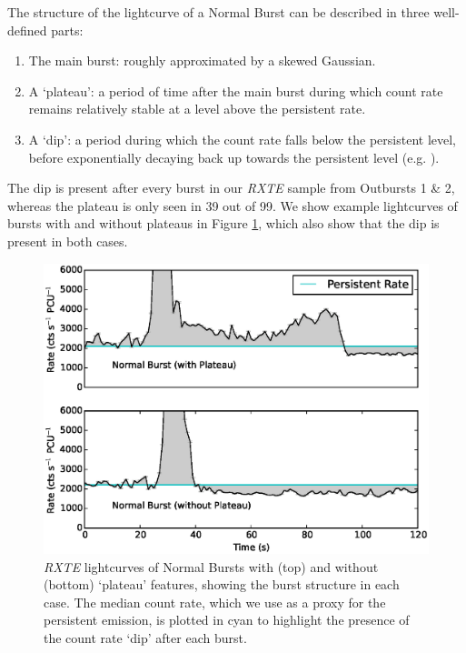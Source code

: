 \par The structure of the lightcurve of a Normal Burst can be described in three well-defined parts:

\begin{enumerate}
\item The main burst: roughly approximated by a skewed Gaussian.
\item A `plateau': a period of time after the main burst during which count rate remains relatively stable at a level above the persistent rate.
\item A `dip': a period during which the count rate falls below the persistent level, before exponentially decaying back up towards the persistent level (e.g. \citealp{Younes_Expo}).
\end{enumerate}

\par The dip is present after every burst in our \textit{RXTE} sample from Outbursts 1 \& 2, whereas the plateau is only seen in 39 out of 99.  We show example lightcurves of bursts with and without plateaus in Figure \ref{fig:w_wo}, which also show that the dip is present in both cases.

\begin{figure}
  \centering
  \includegraphics[width=.9\linewidth, trim={0.8cm 0 1.6cm 0},clip]{images/w_woburst.eps}
  \caption{\small \textit{RXTE} lightcurves of Normal Bursts with (top) and without (bottom) `plateau' features, showing the burst structure in each case.  The median count rate, which we use as a proxy for the persistent emission, is plotted in cyan to highlight the presence of the count rate `dip' after each burst.}
  \label{fig:w_wo}
\end{figure}

